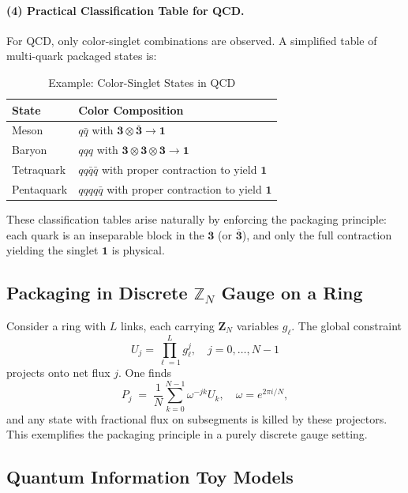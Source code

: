 \documentclass[12pt,a4paper]{article}
\begin{document}
\paragraph{(4) Practical Classification Table for QCD.}
For QCD, only color-singlet combinations are observed. A simplified table of multi-quark packaged states is:
\begin{table}[hbt!]
	\centering
	\caption{Example: Color-Singlet States in QCD}
	\begin{tabular}{|l|l|}
		\hline
		State & Color Composition \\ \hline
		Meson & $q\bar{q}$ with $\mathbf{3}\otimes\overline{\mathbf{3}} \rightarrow \mathbf{1}$ \\ \hline
		Baryon & $qqq$ with $\mathbf{3}\otimes\mathbf{3}\otimes\mathbf{3} \rightarrow \mathbf{1}$ \\ \hline
		Tetraquark & $qq\bar{q}\bar{q}$ with proper contraction to yield $\mathbf{1}$ \\ \hline
		Pentaquark & $qqqq\bar{q}$ with proper contraction to yield $\mathbf{1}$ \\ \hline
	\end{tabular}
\end{table}
These classification tables arise naturally by enforcing the packaging principle: each quark is an inseparable block in the $\mathbf{3}$ (or $\overline{\mathbf{3}}$), and only the full contraction yielding the singlet $\mathbf{1}$ is physical.



\subsection{Packaging in Discrete $\mathbb{Z}_N$ Gauge on a Ring}


Consider a ring with $L$ links, each carrying $\mathbf Z_N$ variables $g_\ell$.
The global constraint
\[
U_j=\prod_{\ell=1}^L g_\ell^j,\quad j=0,\dots,N-1
\]
projects onto net flux $j$.
One finds
\[
P_{j}
\;=\;\frac1N\sum_{k=0}^{N-1} \omega^{-jk} U_k,
\quad \omega=e^{2\pi i/N},
\]
and any state with fractional flux on subsegments is killed by these projectors.
This exemplifies the packaging principle in a purely discrete gauge setting.



\subsection{Quantum Information Toy Models}
\end{document}
